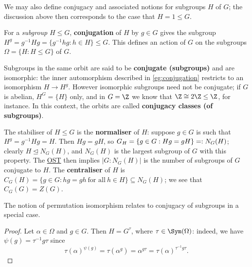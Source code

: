 We may also define conjugacy and associated notions for subgroups $H$ of $G$; the discussion above then corresponds to the case that $H = 1 \leq G$.

\begin{example}\label{eg:conjugation_subgroups}
    For a \textit{subgroup} $H \leq G$, \textbf{conjugation} of $H$ by $g \in G$ gives the subgroup $H^g = g^{-1}Hg = \{g^{-1}hg : h \in H\} \leq G$. This defines an action of $G$ on the subgroups $\Omega = \{H : H \leq G\}$ of $G$.

    Subgroups in the same orbit are said to be \textbf{conjugate (subgroups)} and are isomorphic: the inner automorphism described in \autoref{eg:conjugation} restricts to an isomorphism $H \to H^g$. However isomorphic subgroups need not be conjugate; if $G$ is abelian, $H^G = \{H\}$ only, and in $G = \Z$ we know that $\Z \cong 2\Z \leq \Z$, for instance. In this context, the orbits are called \textbf{conjugacy classes (of subgroups)}.

    The stabiliser of $H \leq G$ is the \textbf{normaliser} of $H$: suppose $g \in G$ is such that $H^g = g^{-1}H g = H$. Then $Hg = gH$, so $\added{2}{G_H} = \{g \in G : Hg = gH\} =: N_G(H)$; clearly $H \trianglelefteq N_G(H)$, and $N_G(H)$ is the largest subgroup of $G$ with this property. The \hyperref[thm:orbit_stabiliser]{OST} then implies $|G : N_G(H)|$ is the number of subgroups of $G$ conjugate to $H$. The \textbf{centraliser} of $H$ is $C_G(H) = \{g \in G : hg = gh\ \text{for all}\ h \in H\} \subseteq N_G(H)$; we see that $C_G(G) = Z(G)$.
\end{example}

The notion of permutation isomorphism relates to conjugacy of subgroups in a special case.


\begin{proof}
    Let $\alpha \in \Omega$ and $g \in G$. Then $H = G^\tau$, where $\tau \in \Sym(\Omega)$: indeed, we have $\psi(g) = \tau^{-1}g\tau$ since
    \[\tau(\alpha)^{\psi(g)} = \tau(\alpha^g) = \alpha^{g\tau} = \tau(\alpha)^{\tau^{-1}g\tau}.\]
\end{proof}

